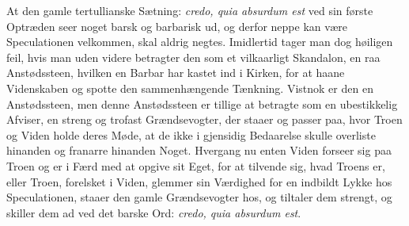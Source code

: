 At den gamle tertullianske Sætning: \textit{credo, quia absurdum
est} ved sin første Optræden seer noget barsk og barbarisk ud, og
derfor neppe kan være Speculationen velkommen, skal aldrig negtes.
Imidlertid tager man dog høiligen feil, hvis man uden videre
betragter den som et vilkaarligt Skandalon, en raa Anstødssteen,
hvilken en Barbar har kastet ind i Kirken, for at haane
Videnskaben og spotte den sammenhængende Tænkning. Vistnok er den
en Anstødssteen, men denne Anstødssteen er tillige at betragte som
en ubestikkelig Afviser, en streng og trofast Grændsevogter, der
staaer og passer paa, hvor Troen og Viden holde deres Møde, at de
ikke i gjensidig Bedaarelse skulle overliste hinanden og franarre
 hinanden Noget. Hvergang nu enten Viden forseer sig paa Troen og
er i Færd med at opgive sit Eget, for at tilvende sig, hvad Troens
er, eller Troen, forelsket i Viden, glemmer sin Værdighed for en
indbildt Lykke hos Speculationen, staaer den gamle Grændsevogter
hos, og tiltaler dem strengt, og skiller dem ad ved det barske
Ord: \textit{credo, quia absurdum est}.

